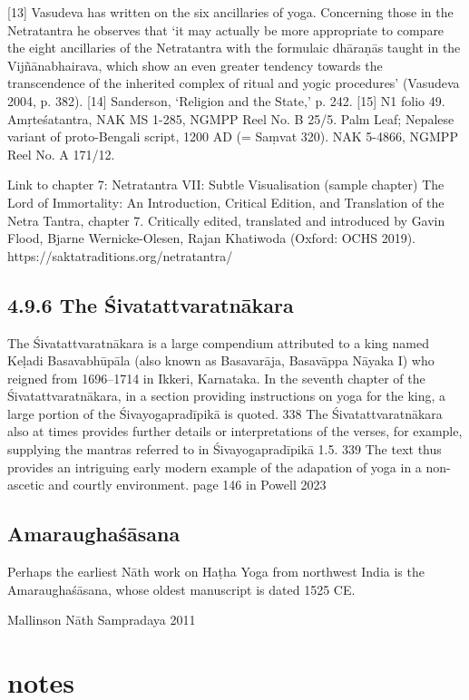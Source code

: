 {[13] Vasudeva has written on the six ancillaries of yoga. Concerning those in the Netratantra he observes that ‘it may actually be more appropriate to compare the eight ancillaries of the Netratantra with the formulaic dhāraṇās taught in the Vijñānabhairava, which show an even greater tendency towards the transcendence of the inherited complex of ritual and yogic procedures’ (Vasudeva 2004, p. 382).
[14] Sanderson, ‘Religion and the State,’ p. 242.
[15] N1 folio 49. Amṛteśatantra, NAK MS 1-285, NGMPP Reel No. B 25/5. Palm Leaf; Nepalese variant of proto-Bengali script, 1200 AD (= Saṃvat 320). NAK 5-4866, NGMPP Reel No. A 171/12.

Link to chapter 7: Netratantra VII: Subtle Visualisation (sample chapter)
The Lord of Immortality: An Introduction, Critical Edition, and Translation of the Netra Tantra, chapter 7. Critically edited, translated and introduced by Gavin Flood, Bjarne Wernicke-Olesen, Rajan Khatiwoda (Oxford: OCHS 2019).
https://saktatraditions.org/netratantra/

\section{4.9.6 The Śivatattvaratnākara}
The Śivatattvaratnākara is a large compendium attributed to a king named Keḷadi Basavabhūpāla (also
known as Basavarāja, Basavāppa Nāyaka I) who reigned from 1696–1714 in Ikkeri, Karnataka. In the
seventh chapter of the Śivatattvaratnākara, in a section providing instructions on yoga for the king, a
large portion of the Śivayogapradīpikā is quoted. 338 The Śivatattvaratnākara also at times provides
further details or interpretations of the verses, for example, supplying the mantras referred to in
Śivayogapradīpikā 1.5. 339 The text thus provides an intriguing early modern example of the adapation of
yoga in a non-ascetic and courtly environment. page 146 in Powell 2023

\section{Amaraughaśāsana}

Perhaps the earliest Nāth work on Haṭha Yoga
from northwest India is the Amaraughaśāsana,
whose oldest manuscript is dated 1525 CE.

Mallinson Nāth Sampradaya 2011 
\chapter{notes}

}
